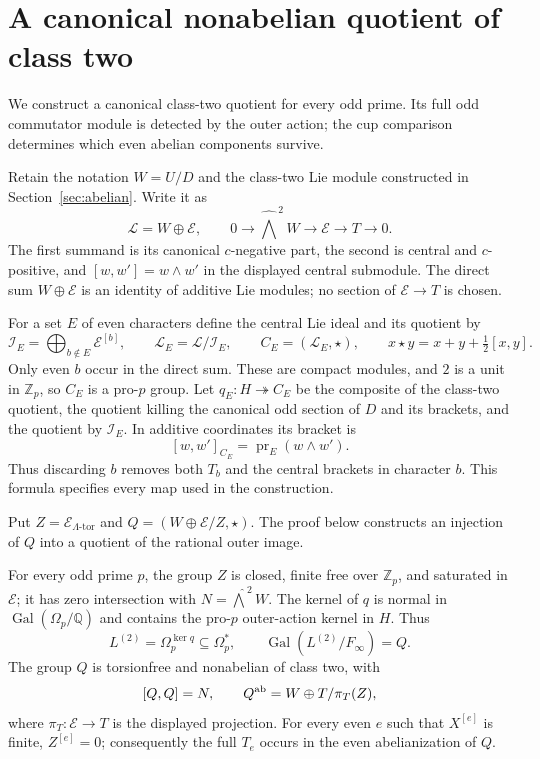 
\section{A canonical nonabelian quotient of class two}
\label{sec:class-two-components}

We construct a canonical class-two quotient for every odd prime.
Its full odd commutator module is detected by the outer action;
the cup comparison determines which even abelian components survive.

Retain the notation $W=U/D$ and the class-two Lie module constructed
in Section~\ref{sec:abelian}.  Write it as
\[
 \mathcal L=W\oplus\mathcal E,\qquad
 0\longrightarrow\widehat{\bigwedge}^{\,2}W
 \longrightarrow\mathcal E\longrightarrow T\longrightarrow0.
\]
The first summand is its canonical $c$-negative part, the second is
central and $c$-positive, and $[w,w']=w\wedge w'$ in the displayed
central submodule.  The direct sum $W\oplus\mathcal E$ is an
identity of additive Lie modules; no section of
$\mathcal E\to T$ is chosen.

For a set $E$ of even characters define the central Lie ideal
and its quotient by
\[
 \mathcal I_E=\bigoplus_{b\notin E}\mathcal E^{[b]},\qquad
 \mathcal L_E=\mathcal L/\mathcal I_E,
 \qquad C_E=(\mathcal L_E,\star),\qquad
 x\star y=x+y+\tfrac12[x,y].
\]
Only even $b$ occur in the direct sum.  These are compact modules,
and $2$ is a unit in $\mathbb Z_p$, so $C_E$ is a pro-$p$ group.
Let $q_E:H\twoheadrightarrow C_E$ be the composite of the
class-two quotient, the quotient killing the canonical odd section
of $D$ and its brackets, and the quotient by $\mathcal I_E$.
In additive coordinates its bracket is
\[
 [w,w']_{C_E}=\operatorname{pr}_E(w\wedge w').
\]
Thus discarding $b$ removes both $T_b$ and the central brackets
in character $b$.  This formula specifies every map used in the
construction.

Put $Z=\mathcal E_{\Lambda\text{-tor}}$ and
$Q=(W\oplus\mathcal E/Z,\star)$. The proof below constructs
an injection of $Q$ into a quotient of the rational outer image.


\begin{theorem}
\label{thm:canonical-torsion-quotient}
For every odd prime $p$, the group $Z$ is closed, finite free
 over $\mathbb Z_p$, and saturated in $\mathcal E$; it has
zero intersection with $N=\widehat{\bigwedge}^{\,2}W$.
The kernel of $q$ is normal in $\operatorname{Gal}(\Omega_p/\mathbb Q)$
and contains the pro-$p$ outer-action kernel in $H$. Thus
\[
 L^{(2)}=\Omega_p^{\ker q}\subseteq\Omega_p^*,\qquad
 \operatorname{Gal}(L^{(2)}/F_\infty)=Q.
\]
The group $Q$ is torsionfree and nonabelian of class two, with
\[
 [Q,Q]=N,\qquad Q^{\rm ab}=W\oplus T/\pi_T(Z),
\]
where $\pi_T:\mathcal E\to T$ is the displayed projection.
For every even $e$ such that $X^{[e]}$ is finite,
$Z^{[e]}=0$; consequently the full $T_e$ occurs in the even
abelianization of $Q$.
\end{theorem}

